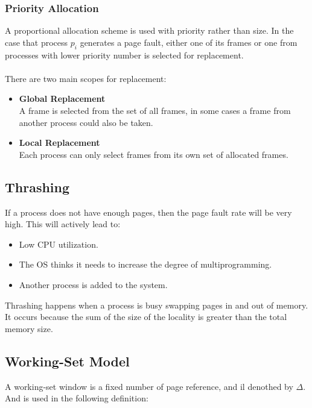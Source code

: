 \documentclass{article}
\begin{document}
\subsubsection{Priority Allocation}
A proportional allocation scheme is used with priority rather than size. In the case that process $p_i$ generates a page fault, either one of its frames or one from processes with lower priority number is selected for replacement. \\ \\
There are two main scopes for replacement:

\begin{itemize}
	\item \textbf{Global Replacement}
	\vspace{.2cm} \\
	A frame is selected from the set of all frames, in some cases a frame from another process could also be taken.
	
	\item \textbf{Local Replacement}
	\vspace{.2cm} \\
	Each process can only select frames from its own set of allocated frames.
\end{itemize}

\subsection{Thrashing}
If a process does not have enough pages, then the page fault rate will be very high. This will actively lead to:

\begin{itemize}
	\item Low CPU utilization.
	\item The OS thinks it needs to increase the degree of multiprogramming.
	\item Another process is added to the system.
\end{itemize}
Thrashing happens when a process is busy swapping pages in and out of memory. It occurs because the sum of the size of the locality is greater than the total memory size.

\subsection{Working-Set Model}
A working-set window is a fixed number of page reference, and il denothed by $\Delta$. And is used in the following definition:
\end{document}
